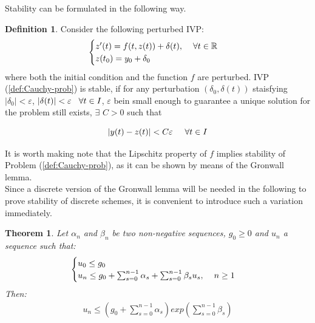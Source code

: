 \documentclass[11pt]{article}
\theoremstyle{theorem}
\newtheorem{theorem}{Theorem}
\theoremstyle{definition}
\newtheorem{definition}{Definition}
\begin{document}
Stability can be formulated in the following way.

\begin{definition}
	\label{def:stability}
	Consider the following perturbed IVP:
	\begin{align}
	\label{eqn:pert-prob}
	\begin{cases}
	z'(t)=f(t,z(t))+\delta(t),\hspace{4mm}\forall t\in\mathbb{R}\\
	z(t_0)=y_0+\delta_0
	\end{cases}
	\end{align}
	where both the initial condition and the function $f$ are perturbed. IVP (\ref{def:Cauchy-prob}) is stable, if for any perturbation $(\delta_0, \delta(t))$ staisfying $|\delta_0|<\varepsilon$, $|\delta(t)|<\varepsilon\hspace{3mm}\forall t\in I$, $\varepsilon$ bein small enough to guarantee a unique solution for the problem still exists, $\exists$ $C>0$ such that 
	
	$$|y(t)-z(t)|<C\varepsilon\hspace{5mm}\forall t\in I$$ 
\end{definition}

It is worth making note that the Lipschitz property of $f$ implies stability of Problem (\ref{def:Cauchy-prob}), as it can be shown by means of the Gronwall lemma.\\

Since a discrete version of the Gronwall lemma will be needed in the following to prove
stability of discrete schemes, it is convenient to introduce such a variation immediately.

\begin{theorem}
	\label{thm:Gronwall-discrete}
	Let $\alpha_n$ and $\beta_n$ be two non-negative sequences, $g_0\ge 0$ and $u_n$ a sequence such that:
	\begin{align}
	\begin{cases}
	u_0\le g_0\\
	u_n\le g_0 + \sum_{s=0}^{n-1}\alpha_s + \sum_{s=0}^{n-1}\beta_su_s, \hspace{4mm}n\ge 1
	\end{cases}
	\end{align}
	Then:
	\begin{align*}
		u_n\le\left(g_0 + \sum_{s=0}^{n-1}\alpha_s\right)exp{\left(\sum_{s=0}^{n-1}\beta_s\right)}	\end{align*}
\end{theorem}
\end{document}
